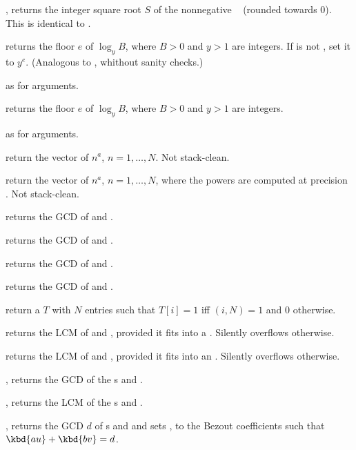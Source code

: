 , returns the integer square root $S$ of
the nonnegative ~ (rounded towards 0). This is identical
to .

returns the floor $e$ of $\log_y B$, where $B > 0$ and $y > 1$ are integers.
If  is not , set it to $y^e$. (Analogous to ,
whithout sanity checks.)

 as  for
 arguments.

 returns the floor $e$ of $\log_y B$, where
$B > 0$ and $y > 1$ are integers.

 as  for
 arguments.

 return the vector of $n^a$, $n = 1,
\dots, N$. Not stack-clean.

 return the vector of $n^a$, $n
= 1, \dots, N$, where the powers are computed at precision . Not
stack-clean.


 returns the GCD of  and .

 returns the GCD of  and .

 returns the GCD of  and .

 returns the GCD of  and .

 return a  $T$ with $N$ entries
such that $T[i] = 1$ iff $(i,N) = 1$ and $0$ otherwise.

 returns the LCM of  and ,
provided it fits into a . Silently overflows otherwise.

 returns the LCM of  and ,
provided it fits into an . Silently overflows otherwise.

, returns the GCD of the s  and
.

, returns the LCM of the s  and
.

, returns the GCD $d$ of
s  and  and sets ,  to the Bezout
coefficients such that $\kbd{au} + \kbd{bv} = d$.

